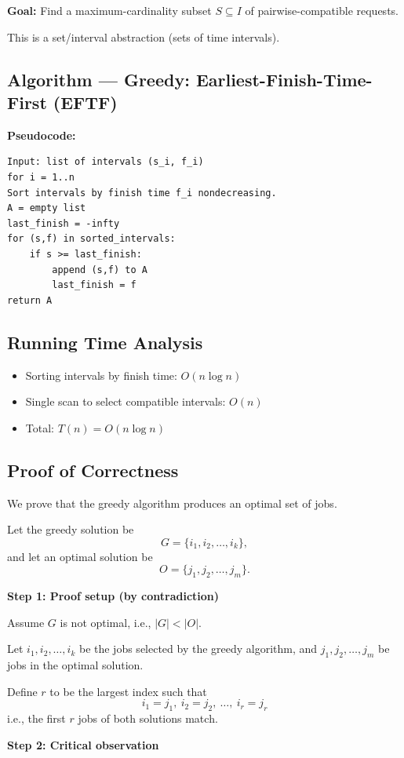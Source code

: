 \documentclass[conference]{IEEEtran}
\begin{document}
\textbf{Goal:} Find a maximum-cardinality subset $S \subseteq I$ of pairwise-compatible requests.  

This is a set/interval abstraction (sets of time intervals).  

\subsection{Algorithm  — Greedy: Earliest-Finish-Time-First (EFTF)}
\textbf{Pseudocode:}
\begin{verbatim}
Input: list of intervals (s_i, f_i) 
for i = 1..n
Sort intervals by finish time f_i nondecreasing.
A = empty list
last_finish = -infty
for (s,f) in sorted_intervals:
    if s >= last_finish:
        append (s,f) to A
        last_finish = f
return A
\end{verbatim}

\subsection{Running Time Analysis}
\begin{itemize}
    \item Sorting intervals by finish time: $O(n \log n)$
    \item Single scan to select compatible intervals: $O(n)$
    \item Total: $T(n) = O(n \log n)$
\end{itemize}

\subsection{Proof of Correctness}

We prove that the greedy algorithm produces an optimal set of jobs.  

Let the greedy solution be 
\[
G = \{i_1, i_2, \dots, i_k\},
\]
and let an optimal solution be 
\[
O = \{j_1, j_2, \dots, j_m\}.
\]

\textbf{Step 1: Proof setup (by contradiction)}  

Assume $G$ is not optimal, i.e., $|G| < |O|$.  

Let $i_1, i_2, \dots, i_k$ be the jobs selected by the greedy algorithm, and $j_1, j_2, \dots, j_m$ be jobs in the optimal solution.  

Define $r$ to be the largest index such that
\[
i_1 = j_1, \ i_2 = j_2, \ \dots, \ i_r = j_r
\]
i.e., the first $r$ jobs of both solutions match.  

\textbf{Step 2: Critical observation}  
\end{document}
